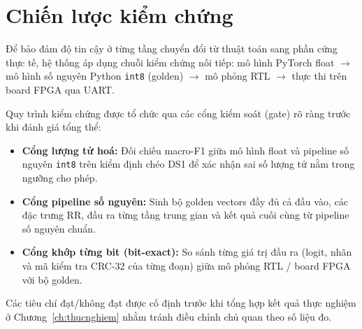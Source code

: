 \section{Chiến lược kiểm chứng}\label{sec:kiemchung}

Để bảo đảm độ tin cậy ở từng tầng chuyển đổi từ thuật toán sang phần cứng thực tế, hệ thống áp dụng chuỗi kiểm chứng nối tiếp: mô hình PyTorch float $\rightarrow$ mô hình số nguyên Python \texttt{int8} (golden) $\rightarrow$ mô phỏng RTL $\rightarrow$ thực thi trên board FPGA qua UART.

Quy trình kiểm chứng được tổ chức qua các cổng kiểm soát (gate) rõ ràng trước khi đánh giá tổng thể:
\begin{itemize}
	\item \textbf{Cổng lượng tử hoá:} Đối chiếu macro-F1 giữa mô hình float và pipeline số nguyên \texttt{int8} trên kiểm định chéo DS1 để xác nhận sai số lượng tử nằm trong ngưỡng cho phép.
	\item \textbf{Cổng pipeline số nguyên:} Sinh bộ golden vectors đầy đủ cả đầu vào, các đặc trưng RR, đầu ra từng tầng trung gian và kết quả cuối cùng từ pipeline số nguyên chuẩn.
	\item \textbf{Cổng khớp từng bit (bit-exact):} So sánh từng giá trị đầu ra (logit, nhãn và mã kiểm tra CRC-32 của từng đoạn) giữa mô phỏng RTL / board FPGA với bộ golden.
\end{itemize}

Các tiêu chí đạt/không đạt được cố định trước khi tổng hợp kết quả thực nghiệm ở Chương~\ref{ch:thucnghiem} nhằm tránh điều chỉnh chủ quan theo số liệu đo.
